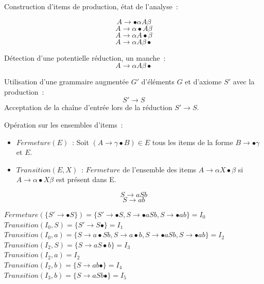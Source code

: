\documentclass{beamer}
\begin{document}
\begin{frame}
 Construction d'items de production, état de l'analyse~:

 $$ A \rightarrow \bullet \alpha A \beta $$
 $$ A \rightarrow \alpha \bullet A \beta $$
 $$ A \rightarrow \alpha A \bullet \beta $$
 $$ A \rightarrow \alpha A \beta \bullet $$

 Détection d'une potentielle réduction, un manche~:
 $$ A \rightarrow \alpha A \beta \bullet $$
\end{frame}

\begin{frame}
	Utilisation d'une grammaire augmentée $G'$ d'éléments $G$ et d'axiome $S'$ avec la production~:
	$$ S' \rightarrow S$$
	Acceptation de la chaîne d'entrée lors de la réduction $ S' \rightarrow S$.
\end{frame}


\begin{frame}
	Opération sur les ensembles d'items~:
	\begin{itemize}
		\item $Fermeture(E)$~: Soit $(A \rightarrow \gamma \bullet B) \in E$ tous les items de la forme $B \rightarrow \bullet \gamma$ et $E$.
		\item $Transition(E, X)$~: $Fermeture$ de l'ensemble des items $A \rightarrow \alpha X \bullet \beta$ si $A \rightarrow \alpha \bullet X \beta$ est présent dans E.
	\end{itemize}
\end{frame}

\begin{frame}
	$$ S \rightarrow aSb $$
	$$ S \rightarrow ab $$

	$Fermeture(\{S' \rightarrow \bullet S\}) = \{
	S' \rightarrow \bullet S,
	S \rightarrow \bullet aSb,
	S \rightarrow \bullet ab
	\} = I_0$ \\
	$Transition(I_0, S) = \{
	S' \rightarrow S \bullet
	\} = I_1$ \\
	$Transition(I_0, a) = \{
	S \rightarrow a \bullet Sb,
	S \rightarrow a \bullet b,
	S \rightarrow \bullet aSb,
	S \rightarrow \bullet ab
	\} = I_2$ \\
	$Transition(I_2, S) = \{
	S \rightarrow aS \bullet b
	\} = I_3$ \\
	$Transition(I_2, a) = I_2$ \\
	$Transition(I_2, b) = \{
	S \rightarrow ab \bullet
	\} = I_4$ \\
	$Transition(I_3, b) = \{
	S \rightarrow aSb \bullet
	\} = I_5$
\end{frame}
\end{document}
